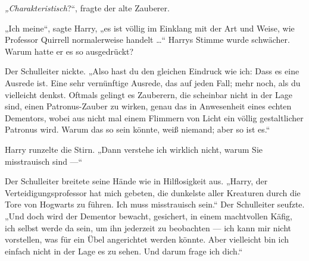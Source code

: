 \emph{„Charakteristisch}?“, fragte der alte Zauberer.

„Ich meine“, sagte Harry, „es ist völlig im Einklang mit der Art und Weise, wie Professor Quirrell normalerweise handelt …“ Harrys Stimme wurde schwächer. Warum hatte er es so ausgedrückt?

Der Schulleiter nickte.
„Also hast du den gleichen Eindruck wie ich: Dass es eine Ausrede ist. Eine sehr vernünftige Ausrede, das auf jeden Fall; mehr noch, als du vielleicht denkst. Oftmals gelingt es Zauberern, die scheinbar nicht in der Lage sind, einen Patronus-Zauber zu wirken, genau das in Anwesenheit eines echten Dementors, wobei aus nicht mal einem Flimmern von Licht ein völlig gestaltlicher Patronus wird. Warum das so sein könnte, weiß niemand; aber so ist es.“

Harry runzelte die Stirn.
„Dann verstehe ich wirklich nicht, warum Sie misstrauisch sind —“

Der Schulleiter breitete seine Hände wie in Hilflosigkeit aus.
„Harry, der Verteidigungsprofessor hat mich gebeten, die dunkelste aller Kreaturen durch die Tore von Hogwarts zu führen. Ich muss misstrauisch sein.“ Der Schulleiter seufzte.
„Und doch wird der Dementor bewacht, gesichert, in einem machtvollen Käfig, ich selbst werde da sein, um ihn jederzeit zu beobachten — ich kann mir nicht vorstellen, was für ein Übel angerichtet werden könnte. Aber vielleicht bin ich einfach nicht in der Lage es zu sehen. Und darum frage ich dich.“

